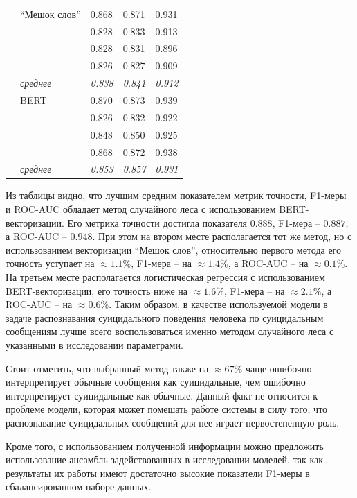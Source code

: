 \begin{table}[H]
\begin{center}
\begin{tabular}{|p{3cm}|p{4cm}|p{2.4cm}|p{2.4cm}|p{2.4cm}|}
			\multirow{8}{*}{\shortstack[l]{Перцептрон}} 
			& ``Мешок слов'' & 0.868 & 0.871 & 0.931 \\
				& & 0.828 & 0.833 & 0.913 \\
				& & 0.828 & 0.831 & 0.896 \\
				& & 0.826 & 0.827 & 0.909 \\
				\cline{2-5} & \textit{среднее} & \textit{0.838} & \textit{0.841} & \textit{0.912} \\
			\cline{2-5}
			& BERT & 0.870 & 0.873 & 0.939 \\
				& & 0.826 & 0.832 & 0.922 \\
				& & 0.848 & 0.850 & 0.925 \\
				& & 0.868 & 0.872 & 0.938 \\
				\cline{2-5} & \textit{среднее} & \textit{0.853} & \textit{0.857} & \textit{0.931} \\
					
			\hline
		\end{tabular}
	\end{center}
\end{table}

Из таблицы видно, что лучшим средним показателем метрик точности, F1-меры и ROC-AUC обладает метод случайного леса с использованием BERT-векторизации.
Его метрика точности достигла показателя $0.888$, F1-мера -- $0.887$, а ROC-AUC -- $0.948$.
При этом на втором месте располагается тот же метод, но с использованием векторизации ``Мешок слов'', относительно первого метода его точность уступает на $\approx 1.1\%$, F1-мера -- на $\approx 1.4\%$, а ROC-AUC -- на $\approx 0.1\%$. На третьем месте располагается логистическая регрессия с использованием BERT-векторизации, его точность ниже на $\approx 1.6\%$, F1-мера -- на $\approx 2.1\%$, а ROC-AUC -- на $\approx 0.6\%$. 
Таким образом, в качестве используемой модели в задаче распознавания суицидального поведения человека по суицидальным сообщениям лучше всего воспользоваться именно методом случайного леса с указанными в исследовании параметрами.

Стоит отметить, что выбранный метод также на $\approx 67\%$ чаще ошибочно интерпретирует обычные сообщения как суицидальные, чем ошибочно интерпретирует суицидальные как обычные. Данный факт не относится к проблеме модели, которая может помешать работе системы в силу того, что распознавание суицидальных сообщений для нее играет первостепенную роль.

Кроме того, с использованием полученной информации можно предложить использование ансамбль задействованных в исследовании моделей, так как результаты их работы имеют достаточно высокие показатели F1-меры в сбалансированном наборе данных.
